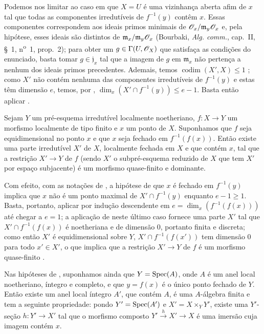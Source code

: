 
Podemos nos limitar ao caso em que $X=U$ é uma vizinhança aberta afim de $x$ tal que todas as componentes irredutíveis de $f^{-1}(y)$ contêm $x$.
Essas componentes correspondem aos ideais primos minimais de $\mathscr{O}_x/\mathfrak m_y\mathscr{O}_x$ e, pela hipótese, esses ideais são distintos de $\mathfrak m_x/\mathfrak m_y\mathscr{O}_x$ (Bourbaki, \emph{Alg. comm.}, cap.~II, \S~1, n\textsuperscript{o}~1, prop.~2); para obter um $g\in\Gamma(U,\mathscr{O}_X)$ que satisfaça as condições do enunciado, basta tomar $g\in\mathfrak j_x$ tal que a imagem de $g$ em $\mathfrak m_x$ não pertença a nenhum dos ideais primos precedentes.
Ademais, temos $\operatorname{codim}(X',X)\leq 1$ ; como $X'$ não contém nenhuma das componentes irredutíveis de $f^{-1}(y)$ e estas têm dimensão $e$, temos, por , $\dim_x(X'\cap f^{-1}(y))\leq e-1$.
Basta então aplicar .

\begin{proposition}[14.5.3]
\label{IV.14.5.3}
Sejam $Y$ um pré-esquema irredutível localmente noetheriano, $f:X\to Y$ um morfismo localmente de tipo finito e $x$ um ponto de $X$.
Suponhamos que $f$ seja equidimensional no ponto $x$ e que $x$ seja fechado em $f^{-1}(f(x))$.
Então existe uma parte irredutível $X'$ de $X$, localmente fechada em $X$ e que contém $x$, tal que a restrição $X'\to Y$ de $f$ (sendo $X'$ o subpré-esquema reduzido de $X$ que tem $X'$ por espaço subjacente) é um morfismo quase-finito e dominante.
\end{proposition}

Com efeito, com as notações de , a hipótese de que $x$ é fechado em $f^{-1}(y)$ implica que $x$ não é um ponto maximal de $X'\cap f^{-1}(y)$ enquanto $e-1\geq 1$.
Basta, portanto, aplicar  por indução descendente em $e=\dim_x(f^{-1}(f(x)))$ até chegar a $e=1$; a aplicação de  neste último caso fornece uma parte $X'$ tal que $X'\cap f^{-1}(f(x))$ é noetheriana e de dimensão $0$, portanto finita e discreta; como então $X'$ é equidimensional sobre $Y$, $X'\cap f^{-1}(f(x'))$ tem dimensão $0$ para todo $x'\in X'$, o que implica que a restrição $X'\to Y$ de $f$ é um morfismo quase-finito .

\begin{corollary}[14.5.4]
\label{IV.14.5.4}
Nas hipóteses de , suponhamos ainda que $Y=\operatorname{Spec}(A)$, onde $A$ é um anel local noetheriano, íntegro e completo, e que $y=f(x)$ é o único ponto fechado de $Y$.
Então existe um anel local íntegro $A'$, que contém $A$, é uma $A$-álgebra finita e tem a seguinte propriedade: pondo $Y'=\operatorname{Spec}(A')$ e $X'=X\times_Y Y'$, existe uma $Y'$-seção $h:Y'\to X'$ tal que o morfismo composto $Y'\xrightarrow{h}X'\to X$ é uma imersão cuja imagem contém $x$.
\end{corollary}

